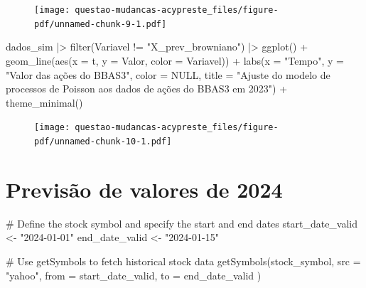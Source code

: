 \documentclass[
  letterpaper,
  DIV=11,
  numbers=noendperiod]{scrreprt}
\newenvironment{Shaded}{\begin{snugshade}}{\end{snugshade}}
\newcommand{\AttributeTok}[1]{\textcolor[rgb]{0.40,0.45,0.13}{#1}}
\newcommand{\CommentTok}[1]{\textcolor[rgb]{0.37,0.37,0.37}{#1}}
\newcommand{\ConstantTok}[1]{\textcolor[rgb]{0.56,0.35,0.01}{#1}}
\newcommand{\FunctionTok}[1]{\textcolor[rgb]{0.28,0.35,0.67}{#1}}
\newcommand{\NormalTok}[1]{\textcolor[rgb]{0.00,0.23,0.31}{#1}}
\newcommand{\OtherTok}[1]{\textcolor[rgb]{0.00,0.23,0.31}{#1}}
\newcommand{\SpecialCharTok}[1]{\textcolor[rgb]{0.37,0.37,0.37}{#1}}
\newcommand{\StringTok}[1]{\textcolor[rgb]{0.13,0.47,0.30}{#1}}
\begin{document}
\begin{figure}[H]

{\centering \texttt{[image: questao-mudancas-acypreste\_files/figure-pdf/unnamed-chunk-9-1.pdf]}

}

\end{figure}

\begin{Shaded}
\begin{Highlighting}[]
\NormalTok{dados\_sim }\SpecialCharTok{|\textgreater{}}
    \FunctionTok{filter}\NormalTok{(Variavel }\SpecialCharTok{!=} \StringTok{"X\_prev\_browniano"}\NormalTok{) }\SpecialCharTok{|\textgreater{}}
    \FunctionTok{ggplot}\NormalTok{() }\SpecialCharTok{+}
    \FunctionTok{geom\_line}\NormalTok{(}\FunctionTok{aes}\NormalTok{(}\AttributeTok{x =}\NormalTok{ t, }\AttributeTok{y =}\NormalTok{ Valor, }\AttributeTok{color =}\NormalTok{ Variavel)) }\SpecialCharTok{+}
    \FunctionTok{labs}\NormalTok{(}\AttributeTok{x =} \StringTok{"Tempo"}\NormalTok{,}
         \AttributeTok{y =} \StringTok{"Valor das ações do BBAS3"}\NormalTok{,}
         \AttributeTok{color =} \ConstantTok{NULL}\NormalTok{,}
         \AttributeTok{title =} \StringTok{"Ajuste do modelo de processos de Poisson}
\StringTok{          aos dados de ações do BBAS3 em 2023"}\NormalTok{) }\SpecialCharTok{+}
    \FunctionTok{theme\_minimal}\NormalTok{()}
\end{Highlighting}
\end{Shaded}

\begin{figure}[H]

{\centering \texttt{[image: questao-mudancas-acypreste\_files/figure-pdf/unnamed-chunk-10-1.pdf]}

}

\end{figure}

\hypertarget{previsuxe3o-de-valores-de-2024-1}{%
\section*{Previsão de valores de
2024}\label{previsuxe3o-de-valores-de-2024-1}}


\begin{Shaded}
\begin{Highlighting}[]
\CommentTok{\# Define the stock symbol and specify the start and end dates}
\NormalTok{start\_date\_valid }\OtherTok{\textless{}{-}} \StringTok{"2024{-}01{-}01"}
\NormalTok{end\_date\_valid }\OtherTok{\textless{}{-}} \StringTok{"2024{-}01{-}15"}

\CommentTok{\# Use getSymbols to fetch historical stock data}
\FunctionTok{getSymbols}\NormalTok{(stock\_symbol,}
    \AttributeTok{src =} \StringTok{"yahoo"}\NormalTok{,}
    \AttributeTok{from =}\NormalTok{ start\_date\_valid,}
    \AttributeTok{to =}\NormalTok{ end\_date\_valid}
\NormalTok{)}
\end{Highlighting}
\end{Shaded}
\end{document}
